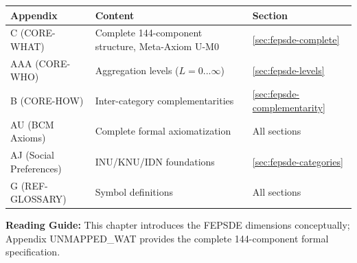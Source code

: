 \begin{tcolorbox}[
    colback=yellow!10!white,
    colframe=orange!75!black,
    title={\textbf{Appendix References for This Chapter}},
    fonttitle=\bfseries
]
\begin{tabular}{lll}
\textbf{Appendix} & \textbf{Content} & \textbf{Section} \\
\midrule
C (CORE-WHAT) & Complete 144-component structure, Meta-Axiom U-M0 & \ref{sec:fepsde-complete} \\
AAA (CORE-WHO) & Aggregation levels ($L = 0...\infty$) & \ref{sec:fepsde-levels} \\
B (CORE-HOW) & Inter-category complementarities & \ref{sec:fepsde-complementarity} \\
AU (BCM Axioms) & Complete formal axiomatization & All sections \\
AJ (Social Preferences) & INU/KNU/IDN foundations & \ref{sec:fepsde-categories} \\
G (REF-GLOSSARY) & Symbol definitions & All sections
\end{tabular}

\medskip
\textbf{Reading Guide:} This chapter introduces the FEPSDE dimensions conceptually;
Appendix UNMAPPED_WAT provides the complete 144-component formal specification.
\end{tcolorbox}

